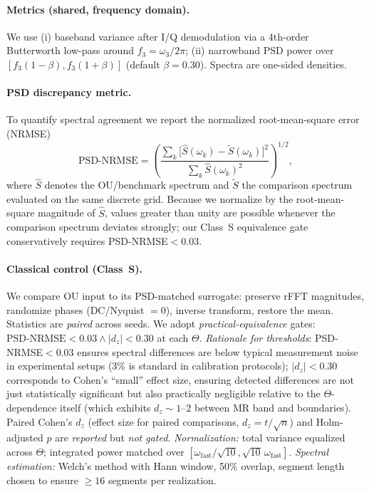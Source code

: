 \documentclass[11pt,letterpaper]{article}
\DeclareRobustCommand{\classS}{\textbf{Class~S}\xspace}
\DeclareRobustCommand{\GatePSD}{\ensuremath{\text{PSD-NRMSE}<0.03}\xspace}
\DeclareRobustCommand{\GateDZ}{\ensuremath{\lvert d_z\rvert<0.30}\xspace}
\DeclareRobustCommand{\GateEQ}{\ensuremath{\GatePSD \wedge \GateDZ}\xspace}
\begin{document}
\paragraph*{Metrics (shared, frequency domain).}
We use (i) baseband variance after I/Q demodulation via a 4th-order Butterworth low-pass around $f_3=\omega_3/2\pi$; (ii) narrowband PSD power over $[f_3(1-\beta),f_3(1+\beta)]$ (default $\beta=0.30$). Spectra are one-sided densities.

\paragraph*{PSD discrepancy metric.}
To quantify spectral agreement we report the normalized root-mean-square error (NRMSE)
\begin{equation}
\mathrm{PSD\text{-}NRMSE}=\left(\frac{\sum_k \bigl[\hat S(\omega_k)-\tilde S(\omega_k)\bigr]^2}{\sum_k \hat S(\omega_k)^2}\right)^{1/2},
\end{equation}
where $\hat S$ denotes the OU/benchmark spectrum and $\tilde S$ the comparison spectrum evaluated on the same discrete grid. Because we normalize by the root-mean-square magnitude of $\hat S$, values greater than unity are possible whenever the comparison spectrum deviates strongly; our Class~S equivalence gate conservatively requires PSD-NRMSE$<0.03$.

\paragraph*{Classical control (\classS).}
We compare OU input to its PSD-matched surrogate: preserve rFFT magnitudes, randomize phases (DC/Nyquist $=0$), inverse transform, restore the mean. Statistics are \emph{paired} across seeds. We adopt \emph{practical-equivalence} gates: \GateEQ{} at each $\Theta$. \emph{Rationale for thresholds}: PSD-NRMSE$<$0.03 ensures spectral differences are below typical measurement noise in experimental setups (3\% is standard in calibration protocols); $|d_z|<$0.30 corresponds to Cohen's ``small'' effect size, ensuring detected differences are not just statistically significant but also practically negligible relative to the $\Theta$-dependence itself (which exhibits $d_z\!\sim\!1$--$2$ between MR band and boundaries). Paired Cohen's $d_z$ (effect size for paired comparisons, $d_z=t/\sqrt{n}$) and Holm-adjusted $p$ are \emph{reported} but \emph{not gated}. \emph{Normalization:} total variance equalized across $\Theta$; integrated power matched over $[\omega_{\mathrm{fast}}/\sqrt{10},\sqrt{10}\,\omega_{\mathrm{fast}}]$. \emph{Spectral estimation:} Welch's method with Hann window, 50\% overlap, segment length chosen to ensure $\ge 16$ segments per realization.
\end{document}
